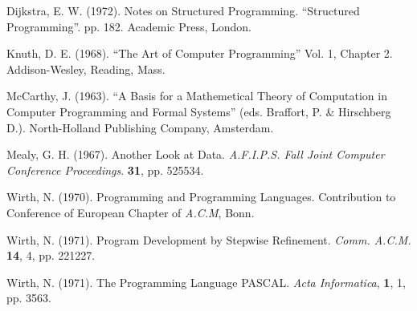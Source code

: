 \noindent
Dijkstra, E. W. (1972). Notes on Structured Programming. ``Structured Programming''. pp. 1\textendash{}82. Academic Press, London.
\medskip

\noindent
Knuth, D. E. (1968). ``The Art of Computer Programming'' Vol. 1, Chapter 2. Addison-Wesley, Reading, Mass.
\medskip

\noindent
McCarthy, J. (1963). ``A Basis for a Mathemetical Theory of Computation in Computer Programming and Formal Systems'' (eds. Braffort, P. \& Hirschberg D.). North-Holland Publishing Company, Amsterdam.
\medskip

\noindent
Mealy, G. H. (1967). Another Look at Data. \textit{A.F.I.P.S. Fall Joint Computer Conference Proceedings}. \textbf{31}, pp. 525\textendash{}534.
\medskip

\noindent
Wirth, N. (1970). Programming and Programming Languages. Contribution to Conference of European Chapter of \textit{A.C.M}, Bonn.
\medskip

\noindent
Wirth, N. (1971). Program Development by Stepwise Refinement. \textit{Comm. A.C.M.} \textbf{14}, 4, pp. 221\textendash{}227.
\medskip

\noindent
Wirth, N. (1971). The Programming Language PASCAL. \textit{Acta Informatica}, \textbf{1}, 1, pp. 35\textendash{}63.
